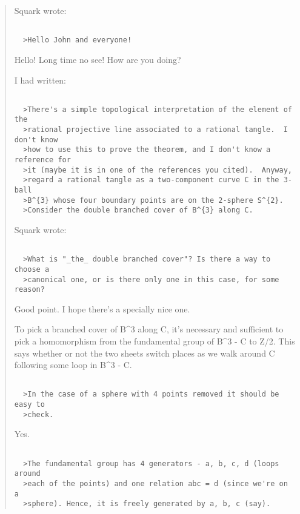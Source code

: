 \begin{quote}
  Squark wrote:


\begin{verbatim}

  >Hello John and everyone!
\end{verbatim}
    

  Hello!  Long time no see!  How are you doing?  

  I had written:


\begin{verbatim}

  >There's a simple topological interpretation of the element of the
  >rational projective line associated to a rational tangle.  I don't know
  >how to use this to prove the theorem, and I don't know a reference for
  >it (maybe it is in one of the references you cited).  Anyway, 
  >regard a rational tangle as a two-component curve C in the 3-ball 
  >B^{3} whose four boundary points are on the 2-sphere S^{2}.
  >Consider the double branched cover of B^{3} along C.
\end{verbatim}
    
Squark wrote:

\begin{verbatim}

  >What is "_the_ double branched cover"? Is there a way to choose a
  >canonical one, or is there only one in this case, for some reason?
\end{verbatim}
    

  Good point.  I hope there's a specially nice one.  

  To pick a branched cover of B^{3} along C, it's necessary and sufficient
  to pick a homomorphism from the fundamental group of B^{3} - C to Z/2.
  This says whether or not the two sheets switch places as we walk around
  C following some loop in B^{3} - C.


\begin{verbatim}

  >In the case of a sphere with 4 points removed it should be easy to
  >check.
\end{verbatim}
    

  Yes.


\begin{verbatim}

  >The fundamental group has 4 generators - a, b, c, d (loops around 
  >each of the points) and one relation abc = d (since we're on a 
  >sphere). Hence, it is freely generated by a, b, c (say).
\end{verbatim}
    


\end{quote}

